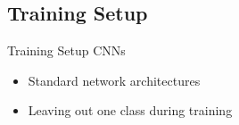 \documentclass[xcolor={usenames,dvipsnames}]{beamer}
\begin{document}
\subsection{Training Setup}
\begin{frame}{Training Setup}
	\glspl{CNN}
	\begin{itemize}
		\item Standard network architectures
		\item Leaving out one class during training
	\end{itemize}
	\hfill
	\hfill	
\end{frame}
\end{document}
